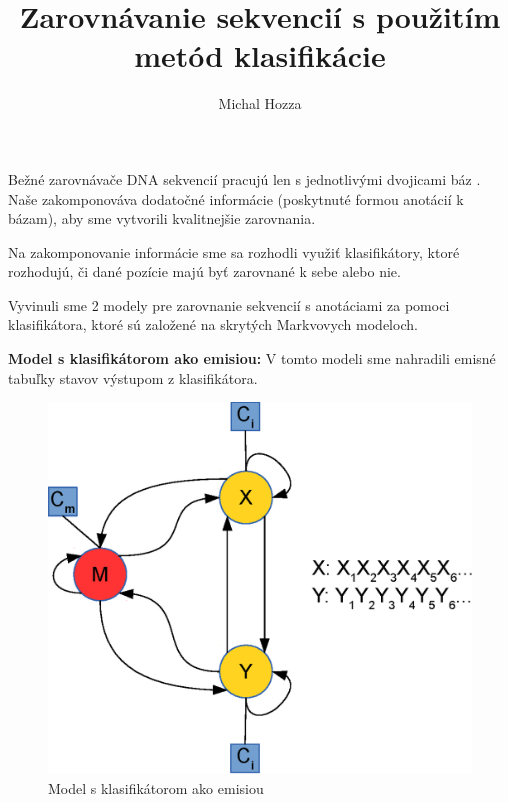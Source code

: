 \documentclass{svk_short_sk}
\begin{document}
\title{Zarovnávanie sekvencií s použitím metód klasifikácie}

\author{Michal Hozza
}




\maketitle

Bežné zarovnávače DNA sekvencií pracujú len s jednotlivými dvojicami báz \cite{durbin}. Naše zakomponováva dodatočné informácie (poskytnuté formou anotácií k bázam), aby sme vytvorili kvalitnejšie zarovnania.


Na zakomponovanie informácie sme sa rozhodli využiť klasifikátory, ktoré rozhodujú, či dané pozície majú byť zarovnané k sebe alebo nie.

Vyvinuli sme 2 modely pre zarovnanie sekvencií s anotáciami za pomoci klasifikátora, ktoré sú založené na skrytých Markvovych modeloch.

\textbf{Model s klasifikátorom ako emisiou:}
V tomto modeli sme nahradili emisné tabuľky stavov výstupom z klasifikátora.

\begin{figure}[htp]
    \centering
    \includegraphics[width=.3\textwidth]{images/model_clf}
    \caption{Model s klasifikátorom ako emisiou}
\end{figure}
\end{document}
